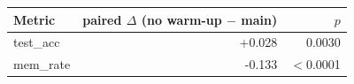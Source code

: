 \begin{tabular}{lrr}
\toprule
Metric & paired $\Delta$ (no warm-up $-$ main) & $p$ \\
\midrule
test\_acc & +0.028 & 0.0030 \\
mem\_rate & -0.133 & $<$0.0001 \\
\bottomrule
\end{tabular}
